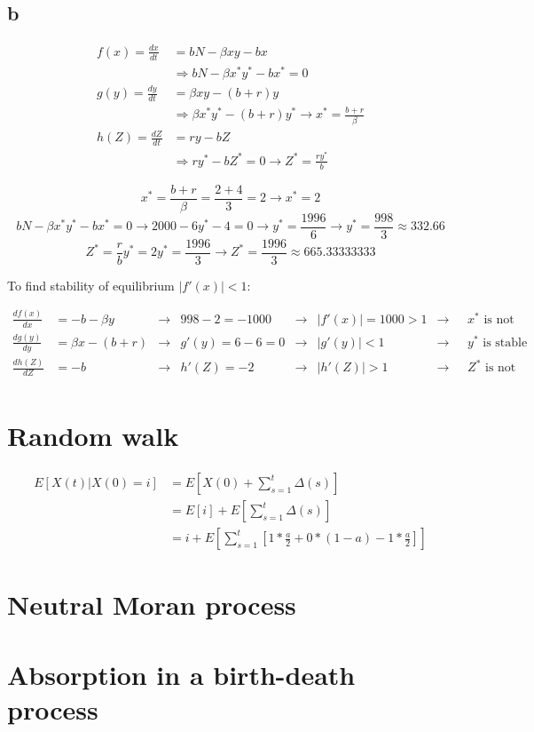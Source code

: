 \subsection{b}

\begin{align*}
f(x) = \frac{dx}{dt} &= bN-\beta xy - bx \\
&\Rightarrow bN - \beta x^* y^* -bx^* = 0 \\
g(y) = \frac{dy}{dt} &= \beta xy - (b+r)y \\
&\Rightarrow \beta x^* y^* - (b+r)y^* \rightarrow x^* = \frac{b+r}{\beta}\\
h(Z) = \frac{dZ}{dt} &= ry - bZ \\
 &\Rightarrow ry^* - bZ^* = 0 \rightarrow Z^* = \frac{ry^*}{b}
\end{align*}

\[ x^* = \frac{b+r}{\beta}  = \frac{2+4}{3} = 2 \rightarrow \boxed{x^* = 2}\]
\[ bN - \beta x^* y^*-bx^* = 0 \rightarrow 2000 -6y^* -4 = 0 \rightarrow y^* = \frac{1996}{6} \rightarrow \boxed{y^*= \frac{998}{3} \approx 332.66} \]
\[ Z^* = \frac{r}{b}y^* = 2y^* = \frac{1996}{3} \rightarrow \boxed{Z^* = \frac{1996}{3} \approx  665.33333333} \]

To find stability of equilibrium $|f'(x)| < 1$:

\begin{align*}
\frac{df(x)}{dx} &= -b-\beta y &\rightarrow& 998-2 = -1000 &\rightarrow&  |f'(x)| = 1000>1 &\rightarrow& \text{ $x^*$ is not stable} \\
\frac{dg(y)}{dy} &= \beta x - (b+r) &\rightarrow& g'(y) = 6-6 = 0 &\rightarrow&  |g'(y)| < 1 &\rightarrow& \text{ $y^*$ is stable}\\
\frac{dh(Z)}{dZ} &= - b &\rightarrow& h'(Z) = -2 &\rightarrow& |h'(Z)| > 1 &\rightarrow&   \text{ $Z^*$ is not stable} \\
\end{align*}

\setcounter{chapter}{3}
\setcounter{section}{0}
\section{Random walk}

\begin{align*}
E[X(t) | X(0)  = i ] &= E[X(0) + \sum\limits_{s=1}^{t} \Delta(s) ] \\
&= E[i] + E\left[  \sum\limits_{s=1}^{t} \Delta(s) \right] \\
&= i + E \left[ \sum\limits_{s=1}^{t} \left[1 * \frac{a}{2} + 0 * (1-a) -1*\frac{a}{2}\right] \right]
\end{align*}


\setcounter{chapter}{4}
\setcounter{section}{0}
\section{Neutral Moran process}


\setcounter{chapter}{5}
\setcounter{section}{0}
\section{Absorption in a birth-death process}

